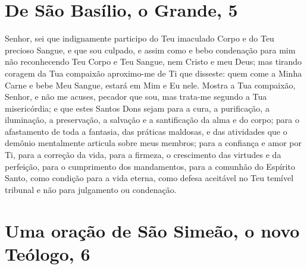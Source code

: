 \documentclass{subfiles}
\begin{document}
\section*{De São Basílio, o Grande, 5}

Senhor, sei que indignamente participo do Teu imaculado Corpo e do Teu precioso
Sangue, e que sou culpado, e assim como e bebo condenação para mim não
reconhecendo Teu Corpo e Teu Sangue, nem Cristo e meu Deus; mas tirando coragem
da Tua compaixão aproximo-me de Ti que disseste: quem come a Minha Carne e bebe
Meu Sangue, estará em Mim e Eu nele. Mostra a Tua compaixão, Senhor, e não me
acuses, pecador que sou, mas trata-me segundo a Tua misericórdia; e que estes
Santos Dons sejam para a cura, a purificação, a iluminação, a preservação, a
salvação e a santificação da alma e do corpo; para o afastamento de toda a
fantasia, das práticas maldosas, e das atividades que o demônio mentalmente
articula sobre meus membros; para a confiança e amor por Ti, para a correção da
vida, para a firmeza, o crescimento das virtudes e da perfeição, para o
cumprimento dos mandamentos, para a comunhão do Espírito Santo, como condição
para a vida eterna, como defesa aceitável no Teu temível tribunal e não para
julgamento ou condenação.


\section*{Uma oração de São Simeão, o novo Teólogo, 6}
\end{document}
